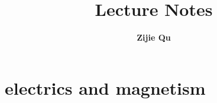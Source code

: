\documentclass[12pt]{report}
\title{\textrm{Lecture Notes}}
\author{\Large\textbf{\textrm{Zijie Qu}} \\ \large\university{shanghai jiao tong university}}
\date{\submissiondate{September 11, 2025}}
\begin{document}

\newpage 
\toc
\thispagestyle{empty}
\newpage 

\part[Electrics and Magnetism]{electrics and magnetism}

\fancypage

\end{document}
